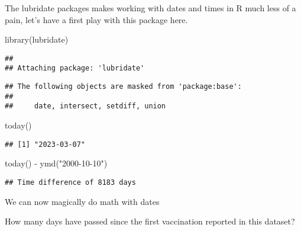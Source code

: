 \documentclass[
]{article}
\newenvironment{Shaded}{\begin{snugshade}}{\end{snugshade}}
\newcommand{\CommentTok}[1]{\textcolor[rgb]{0.56,0.35,0.01}{\textit{#1}}}
\newcommand{\FunctionTok}[1]{\textcolor[rgb]{0.00,0.00,0.00}{#1}}
\newcommand{\NormalTok}[1]{#1}
\newcommand{\OtherTok}[1]{\textcolor[rgb]{0.56,0.35,0.01}{#1}}
\newcommand{\SpecialCharTok}[1]{\textcolor[rgb]{0.00,0.00,0.00}{#1}}
\newcommand{\StringTok}[1]{\textcolor[rgb]{0.31,0.60,0.02}{#1}}
\begin{document}
The lubridate packages makes working with dates and times in R much less
of a pain, let's have a first play with this package here.

\begin{Shaded}
\begin{Highlighting}[]
\FunctionTok{library}\NormalTok{(lubridate)}
\end{Highlighting}
\end{Shaded}

\begin{verbatim}
## 
## Attaching package: 'lubridate'
\end{verbatim}

\begin{verbatim}
## The following objects are masked from 'package:base':
## 
##     date, intersect, setdiff, union
\end{verbatim}

\begin{Shaded}
\begin{Highlighting}[]
\FunctionTok{today}\NormalTok{()}
\end{Highlighting}
\end{Shaded}

\begin{verbatim}
## [1] "2023-03-07"
\end{verbatim}

\begin{Shaded}
\begin{Highlighting}[]
\FunctionTok{today}\NormalTok{() }\SpecialCharTok{{-}} \FunctionTok{ymd}\NormalTok{(}\StringTok{"2000{-}10{-}10"}\NormalTok{)}
\end{Highlighting}
\end{Shaded}

\begin{verbatim}
## Time difference of 8183 days
\end{verbatim}

We can now magically do math with dates

\begin{Shaded}
\end{Shaded}

How many days have passed since the first vaccination reported in this
dataset?
\end{document}
